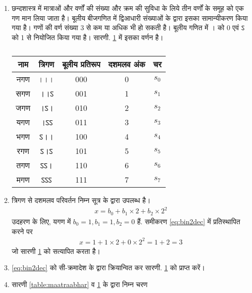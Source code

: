 
\renewcommand{\theequation}{\theenumi}
\renewcommand{\thefigure}{\theenumi}
\begin{enumerate}[label=\thesection.\arabic*.,ref=\thesection.\theenumi]
\item छन्दशास्त्र में मात्राओं और वर्णों की संख्या और क्रम की सुविधा के लिये तीन वर्णों के समूह को एक गण मान लिया जाता है।   बूलीय बीजगणित में द्विआधारी संख्याओं  के द्वारा इसका सामान्यीकरण किया गया है।   गणों की वर्ण संख्या 3 से कम या अधिक भी हो सकती है।   बूलीय गणित में । को 0 एवं ऽ को 1  से नियोजित किया गया है। सारणी. \ref{table:3bit} में इसका वर्णन है। 

\begin{table}[!ht]
\centering
\begin{tabular}{|c|c|c|c|c|}
\hline
नाम & त्रिगण & बूलीय प्रतिरूप & दशमलव अंक  & चर\\ \hline
नगण   &   ।।। &  000 & 0 & $s_0$\\ \hline
सगण  &  ।।ऽ &  001 & 1 & $s_1$\\ \hline
जगण  &  ।ऽ। & 010  & 2 & $s_2$\\ \hline
यगण   &  ।ऽऽ &   011 & 3 & $s_3$\\ \hline
 भगण &   ऽ।। &  100 & 4  & $s_4$\\ \hline
रगण  & ऽ।ऽ  &   101 & 5  & $s_5$\\ \hline
तगण  &  ऽऽ। &  110  & 6 & $s_6$\\ \hline
मगण  &  ऽऽऽ &  111 & 7 & $s_7$\\ \hline
\end{tabular}
\caption{}
\label{table:3bit}
\end{table}
\item त्रिगण से दशमलव परिवर्तन निम्न सूत्र के द्वारा उपलब्ध है। 
\begin{align}
\label{eq:bin2dec}
x = b_0 + b_1\times 2 + b_2 \times 2^2
\end{align}
उदहरण के लिए,  यगण में $b_0 = 1, b_1 = 1, b_2 = 0 $ हैं.  समीकरण \eqref{eq:bin2dec} में प्रतिस्थापित करने पर 
\begin{align}
\label{eq:bin2dec}
x = 1 + 1\times 2 + 0 \times 2^2 = 1 + 2 = 3
\end{align}
%
जो सारणी \ref{table:3bit} को सत्यापित करता है। 
\item \eqref{eq:bin2dec} को  सी-क्रमादेश के द्वारा क्रियान्वित कर  सारणी. \ref{table:3bit} को प्राप्त करें। 
\item    सारणी \ref{table:maatraabhar} व \ref{table:3bit} के द्वारा  निम्न चरण 

\end{enumerate}
